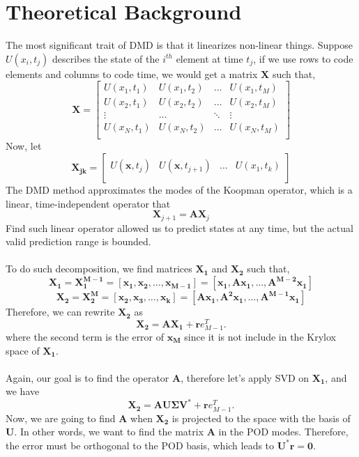 \documentclass{article}
\begin{document}
\section{Theoretical Background}
The most significant trait of DMD is that it linearizes non-linear things. Suppose $U(x_i, t_j)$ describes the state of the $i^{th}$ element at time $t_j$, if we use rows to code elements and columns to code time, we would get a matrix $\mathbf{X}$ such that,
\[
\mathbf{X} = 
\begin{bmatrix}
U(x_1, t_1) & U(x_1, t_2) & \dots & U(x_1, t_M) \\
U(x_2, t_1) & U(x_2, t_2) & \dots & U(x_2, t_M) \\
\vdots & \dots & \ddots & \vdots \\
U(x_N, t_1) & U(x_N, t_2) & \dots & U(x_N, t_M) \\
\end{bmatrix}
\]
Now, let 
\[
\mathbf{X_{jk}} = 
\begin{bmatrix}
U(\mathbf{x}, t_j) & U(\mathbf{x}, t_{j+1}) & \dots & U(x_1, t_k) \\
\end{bmatrix}
\]
The DMD method approximates the modes of the Koopman operator, which is a linear, time-independent operator that
\[
\mathbf{X}_{j+1} = \mathbf{AX}_j
\]
Find such linear operator allowed us to predict states at any time, but the actual valid prediction range is bounded. \\
~\\
To do such decomposition, we find matrices $\mathbf{X_1}$ and $\mathbf{X_2}$ such that,
\[
\mathbf{X_1}=\mathbf{X_1^{M-1}} = [\mathbf{x_1},\mathbf{x_2},\dots, \mathbf{x_{M-1}}] = [\mathbf{x_1},\mathbf{Ax_1},\dots, \mathbf{A^{M-2}x_{1}}]
\]
\[
\mathbf{X_2}=\mathbf{X_2^{M}} = [\mathbf{x_2},\mathbf{x_3},\dots, \mathbf{x_{k}}]= [\mathbf{Ax_1},\mathbf{A^2x_1},\dots, \mathbf{A^{M-1}x_{1}}]
\]
Therefore, we can rewrite $\mathbf{X_2}$ as
\[
\mathbf{X_2} = \mathbf{AX_1} + \mathbf{r}e^T_{M-1}.
\]
where the second term is the error of $\mathbf{x_M}$ since it is not include in the Krylox space of $\mathbf{X_1}$. \\
~\\
Again, our goal is to find the operator $\mathbf{A}$, therefore let's apply SVD on  $\mathbf{X_1}$, and we have
\[
\mathbf{X_2} = \mathbf{AU\Sigma V^*} + \mathbf{r}e^T_{M-1}.
\]
Now, we are going to find $\mathbf{A}$ when $\mathbf{X_2}$ is projected to the space with the basis of $\mathbf{U}$. In other words, we want to find the matrix $\mathbf{A}$ in the POD modes. Therefore, the error must be orthogonal to the POD basis, which leads to $\mathbf{U^*r=0}$.
\end{document}
